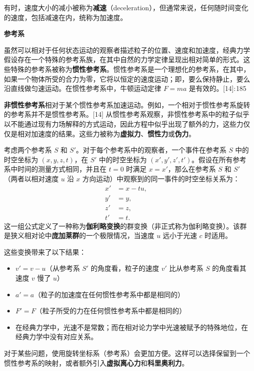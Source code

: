 有时，速度大小的减小被称为\textbf{减速}（deceleration），但通常来说，任何随时间变化的速度，包括减速在内，统称为加速度。

\textbf{参考系}  

虽然可以相对于任何状态运动的观察者描述粒子的位置、速度和加速度，经典力学假设存在一个特殊的参考系族，在其中自然的力学定律呈现出相对简单的形式。这些特殊的参考系被称为\textbf{惯性参考系}。惯性参考系是一个理想化的参考系，在其中，如果一个物体所受的合力为零，它将以恒定的速度运动；即，要么保持静止，要么沿直线做匀速运动。在惯性参考系中，牛顿运动定律 \( F = ma \) 是有效的。[14]: 185   

\textbf{非惯性参考系}相对于某个惯性参考系加速运动。例如，一个相对于惯性参考系旋转的参考系并不是惯性参考系。[14] 从惯性参考系观察，非惯性参考系中的粒子似乎以不能通过现有力场解释的方式运动，因此方程中似乎出现了额外的力，这些力仅仅是相对加速度的结果。这些力被称为\textbf{虚拟力}、\textbf{惯性力}或\textbf{伪力}。  

考虑两个参考系 \( S \) 和 \( S' \)。对于每个参考系中的观察者，一个事件在参考系 \( S \) 中的时空坐标为 \( (x, y, z, t) \)，在 \( S' \) 中的时空坐标为 \( (x', y', z', t') \)。假设在所有参考系中时间的测量方式相同，并且在 \( t = 0 \) 时满足 \( x = x' \)，那么在参考系 \( S \) 和 \( S' \)（两者以相对速度 \( u \) 沿 \( x \) 方向运动）中观察到的同一事件的时空坐标关系为：  
\[
\begin{aligned}
x' &= x - tu, \\
y' &= y, \\
z' &= z, \\
t' &= t.
\end{aligned}~
\]  
这一组公式定义了一种称为\textbf{伽利略变换}的群变换（非正式称为伽利略变换）。该群是狭义相对论中\textbf{庞加莱群}的一个极限情况，当速度 \( u \) 远小于光速 \( c \) 时适用。  

这些变换带来了以下结果：  
\begin{itemize}
\item \( v' = v - u \)（从参考系 \( S' \) 的角度看，粒子的速度 \( v' \) 比从参考系 \( S \) 的角度看其速度 \( v \) 慢了 \( u \)）  
\item \( a' = a \)（粒子的加速度在任何惯性参考系中都是相同的）  
\item \( F' = F \)（粒子所受的力在任何惯性参考系中都是相同的）  
\item 在经典力学中，光速不是常数；而在相对论力学中光速被赋予的特殊地位，在经典力学中没有对应关系。 
\end{itemize} 
对于某些问题，使用旋转坐标系（参考系）会更加方便。这样可以选择保留到一个惯性参考系的映射，或者额外引入\textbf{虚拟离心力}和\textbf{科里奥利力}。
